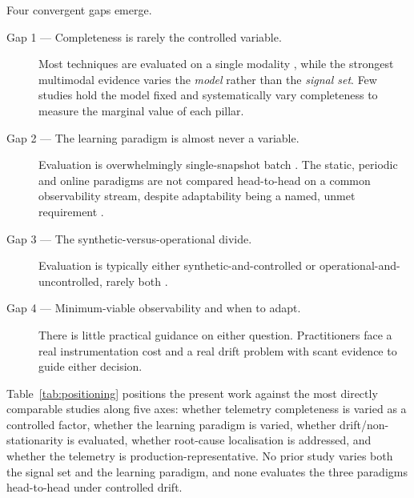 \documentclass[acmsmall]{acmart}
\begin{document}
Four convergent gaps emerge.

\begin{description}
  \item[Gap 1 --- Completeness is rarely the controlled variable.] Most techniques are evaluated on a single modality \cite{lomio2022,mart2020}, while the strongest multimodal evidence \cite{han2024} varies the \emph{model} rather than the \emph{signal set}. Few studies hold the model fixed and systematically vary completeness to measure the marginal value of each pillar.
  \item[Gap 2 --- The learning paradigm is almost never a variable.] Evaluation is overwhelmingly single-snapshot batch \cite{lomio2022,dkmak2025,han2024}. The static, periodic and online paradigms are not compared head-to-head on a common observability stream, despite adaptability being a named, unmet requirement \cite{raeiszadeh2026}.
  \item[Gap 3 --- The synthetic-versus-operational divide.] Evaluation is typically either synthetic-and-controlled or operational-and-uncontrolled, rarely both \cite{hrusto2026,islam2021}.
  \item[Gap 4 --- Minimum-viable observability and when to adapt.] There is little practical guidance on either question. Practitioners face a real instrumentation cost \cite{leadingobs,kosinska2023} and a real drift problem \cite{islam2021} with scant evidence to guide either decision.
\end{description}

Table~\ref{tab:positioning} positions the present work against the most directly comparable studies along five axes: whether telemetry completeness is varied as a controlled factor, whether the learning paradigm is varied, whether drift/non-stationarity is evaluated, whether root-cause localisation is addressed, and whether the telemetry is production-representative. No prior study varies both the signal set and the learning paradigm, and none evaluates the three paradigms head-to-head under controlled drift.
\end{document}
